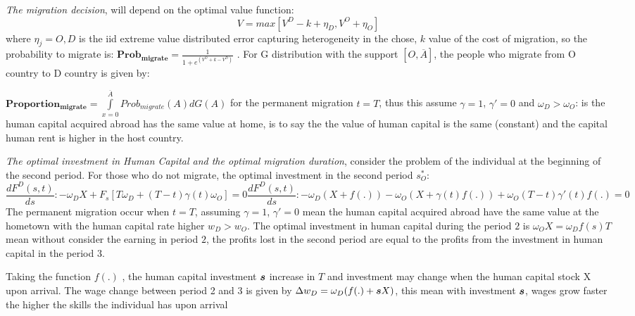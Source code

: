 \documentclass[11pt]{article}
\theoremstyle{prop}
\begin{document}
		
	\textit{The migration decision}, will depend on the optimal value function:
	\begin{equation} 
	 V=max[V^D-k+ \eta_D, V^O +\eta_O]      \label{5}
	\end{equation}	
	where $\eta_j=O,D$ is the iid extreme value distributed error capturing heterogeneity in the chose, $k$ value of the cost of migration, so the probability to migrate is: $\bm{Prob_{migrate}} = \frac{1}{1+e^(V^O+k-V^D)}$ . For G distribution with the support $[O, \overline{A}]$, the people who migrate from O country to D country is given by: 
	
	$\bm{Proportion_{migrate}}=\int \limits_{x=0}^{\overline{A}}Prob_{migrate}(A)dG(A) $
	for the permanent migration $t=T$, thus this assume $\gamma=1$,  $\gamma'=0$ and $\omega_D>\omega_O$: is the human capital acquired abroad has the same value at home, is to say the the value of human capital is the same (constant) and the capital human rent is higher in the host country.

	\textit{The optimal investment in Human Capital and the optimal migration duration}, consider the problem of the individual at the beginning of the second period. For those who do not migrate, the optimal investment in the second period $s^*_O$:	
	\begin{subequations}
	\begin{equation}
		\frac{dF^D(s,t)}{ds}: -\omega_DX + F_s[T\omega_D +(T-t) \gamma(t) \omega_O] = 0 
	\end{equation}
	\begin{equation}
		\frac{dF^D(s,t)}{ds}: -\omega_D(X + f(.)) - \omega_O (X+ \gamma(t)f(.)) +\omega_O(T-t)\gamma'(t)f(.)= 0
	\end{equation}
	\end{subequations}
	The permanent migration occur when $t=T$, assuming $\gamma=1$, $\gamma'=0$ mean the human capital acquired abroad have the same value at the hometown with the human capital rate higher $w_D >w_O$. The optimal investment in human capital during the {\color{BlueG} period $2$} is $\omega_OX = \omega_Df(s)T$ mean without consider the earning in {\color{BlueG} period $2$}, the profits lost in the second period are equal to the profits from the investment in human capital in the {\color{BlueG} period $3$}. 
	
	Taking the function $f(.)$ , the human capital investment $\hm{s}$ increase in $T$ and investment may change when the human capital stock X upon arrival. The wage change between {\color{BlueG} period 2} and {\color{BlueG}3} is given by $\Delta w_D= \omega_D(f(.) + \hm{s}X)$, this mean with investment $\hm{s}$, wages grow faster the higher the skills the individual has upon arrival
\end{document}

